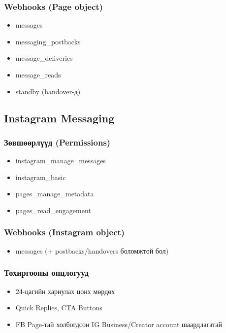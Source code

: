 \documentclass[12pt,A4]{report}
\begin{document}
\subsubsection{Webhooks (Page object)}
\begin{itemize}
    \item messages
    \item messaging\_postbacks
    \item message\_deliveries
    \item message\_reads
    \item standby (handover-д)
\end{itemize}

\subsection{Instagram Messaging}

\subsubsection{Зөвшөөрлүүд (Permissions)}
\begin{itemize}
    \item instagram\_manage\_messages
    \item instagram\_basic
    \item pages\_manage\_metadata
    \item pages\_read\_engagement
\end{itemize}

\subsubsection{Webhooks (Instagram object)}
\begin{itemize}
    \item messages (+ postbacks/handovers боломжтой бол)
\end{itemize}

\subsubsection{Тохиргооны онцлогууд}
\begin{itemize}
    \item 24-цагийн хариулах цонх мөрдөх
    \item Quick Replies, CTA Buttons
    \item FB Page-тай холбогдсон IG Business/Creator account шаардлагатай
\end{itemize}
\end{document}
